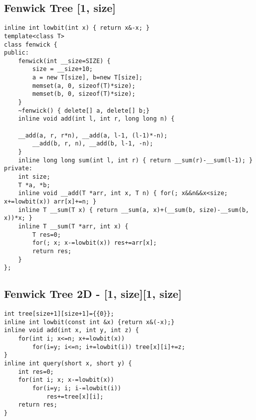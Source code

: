 \documentclass[11pt,twocolumn,a4paper]{article}
\begin{document}
\subsection{Fenwick Tree [1, size]}
\begin{lstlisting}[label=Fenwick Tree]
inline int lowbit(int x) { return x&-x; }
template<class T>
class fenwick {
public:
	fenwick(int __size=SIZE) {
		size = __size+10;
		a = new T[size], b=new T[size];
		memset(a, 0, sizeof(T)*size);
		memset(b, 0, sizeof(T)*size);
	}
	~fenwick() { delete[] a, delete[] b;}
	inline void add(int l, int r, long long n) {

	__add(a, r, r*n), __add(a, l-1, (l-1)*-n);
		__add(b, r, n), __add(b, l-1, -n);
	}
	inline long long sum(int l, int r) { return __sum(r)-__sum(l-1); }
private:
	int size;
	T *a, *b;
	inline void __add(T *arr, int x, T n) { for(; x&&n&&x<size; x+=lowbit(x)) arr[x]+=n; }
	inline T __sum(T x) { return __sum(a, x)+(__sum(b, size)-__sum(b, x))*x; }
	inline T __sum(T *arr, int x) {
		T res=0;
		for(; x; x-=lowbit(x)) res+=arr[x];
		return res;
	}
};
\end{lstlisting}

\subsection{Fenwick Tree 2D - [1, size][1, size]}
\begin{lstlisting}[label=Fenwick Tree 2D]
int tree[size+1][size+1]={{0}};
inline int lowbit(const int &x) {return x&(-x);}
inline void add(int x, int y, int z) {
	for(int i; x<=n; x+=lowbit(x))
		for(i=y; i<=n; i+=lowbit(i)) tree[x][i]+=z;
}
inline int query(short x, short y) {
	int res=0;	
	for(int i; x; x-=lowbit(x))
		for(i=y; i; i-=lowbit(i))
			res+=tree[x][i];
	return res;
}
\end{lstlisting}

\newpage
\end{document}
